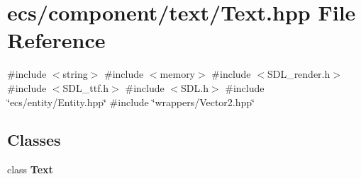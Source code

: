 \section{ecs/component/text/\+Text.hpp File Reference}
\label{_text_8hpp}
{\ttfamily \#include $<$string$>$}\newline
{\ttfamily \#include $<$memory$>$}\newline
{\ttfamily \#include $<$S\+D\+L\+\_\+render.\+h$>$}\newline
{\ttfamily \#include $<$S\+D\+L\+\_\+ttf.\+h$>$}\newline
{\ttfamily \#include $<$S\+D\+L.\+h$>$}\newline
{\ttfamily \#include \char`\"{}ecs/entity/\+Entity.\+hpp\char`\"{}}\newline
{\ttfamily \#include \char`\"{}wrappers/\+Vector2.\+hpp\char`\"{}}\newline
\subsection*{Classes}
\begin{DoxyCompactItemize}
\item 
class \textbf{ Text}
\end{DoxyCompactItemize}
